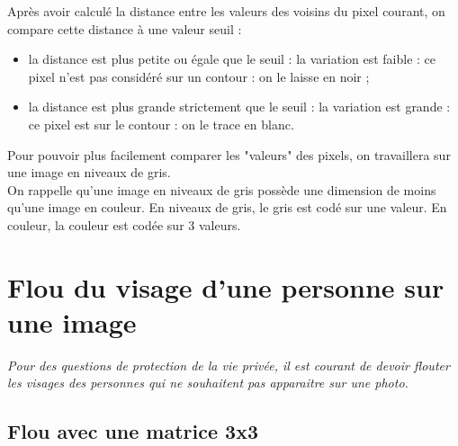 Après avoir calculé la distance entre les valeurs des voisins du pixel courant, on compare cette distance à une valeur seuil :
\begin{itemize}
\item la distance est plus petite ou égale que le seuil : la variation est faible : ce pixel n'est pas considéré sur un contour : on le laisse en noir ;
\item la distance est plus grande strictement que le seuil : la variation est grande : ce pixel est sur le contour : on le trace en blanc.
\end{itemize}

Pour pouvoir plus facilement comparer les "valeurs" des pixels, on travaillera sur une image en niveaux de gris.\\
On rappelle qu'une image en niveaux de gris possède une dimension de moins qu'une image en couleur. En niveaux de gris, le gris est codé sur une valeur. En couleur, la couleur est codée sur 3 valeurs.








\section{Flou du visage d'une personne sur une image}

\textit{Pour des questions de protection de la vie privée, il est courant de devoir flouter les visages des personnes qui ne souhaitent pas apparaitre sur une photo. }


\subsection{Flou avec une matrice 3x3}



